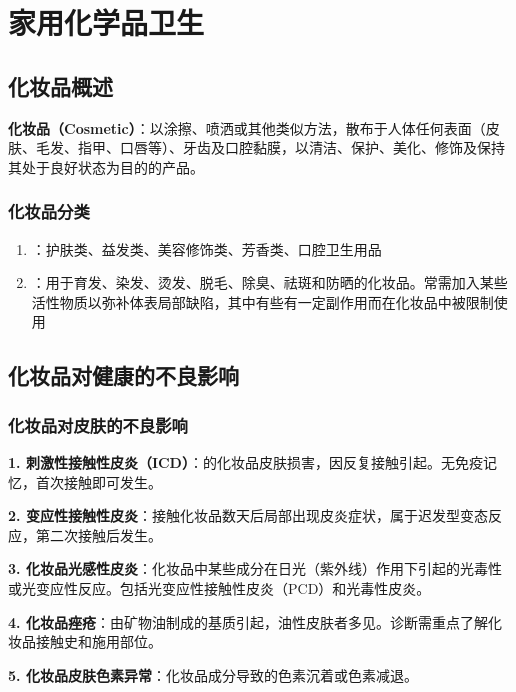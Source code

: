 \chapter{家用化学品卫生}
\setcounter{chapter}{9}

\section{化妆品概述}

\begin{defbox}
\textbf{化妆品（Cosmetic）}：以涂擦、喷洒或其他类似方法，散布于人体任何表面（皮肤、毛发、指甲、口唇等）、牙齿及口腔黏膜，以清洁、保护、美化、修饰及保持其处于良好状态为目的的产品。
\end{defbox}

\subsection{化妆品分类}

\begin{enumerate}[leftmargin=*]
    \item {}：护肤类、益发类、美容修饰类、芳香类、口腔卫生用品
    \item {}：用于育发、染发、烫发、脱毛、除臭、祛斑和防晒的化妆品。常需加入某些活性物质以弥补体表局部缺陷，其中有些有一定副作用而在化妆品中被限制使用
\end{enumerate}

\section{化妆品对健康的不良影响}

\subsection{化妆品对皮肤的不良影响}

\begin{keybox}
\textbf{1. 刺激性接触性皮炎（ICD）}：的化妆品皮肤损害，因反复接触引起。无免疫记忆，首次接触即可发生。

\textbf{2. 变应性接触性皮炎}：接触化妆品数天后局部出现皮炎症状，属于迟发型变态反应，第二次接触后发生。

\textbf{3. 化妆品光感性皮炎}：化妆品中某些成分在日光（紫外线）作用下引起的光毒性或光变应性反应。包括光变应性接触性皮炎（PCD）和光毒性皮炎。

\textbf{4. 化妆品痤疮}：由矿物油制成的基质引起，油性皮肤者多见。诊断需重点了解化妆品接触史和施用部位。

\textbf{5. 化妆品皮肤色素异常}：化妆品成分导致的色素沉着或色素减退。
\end{keybox}

